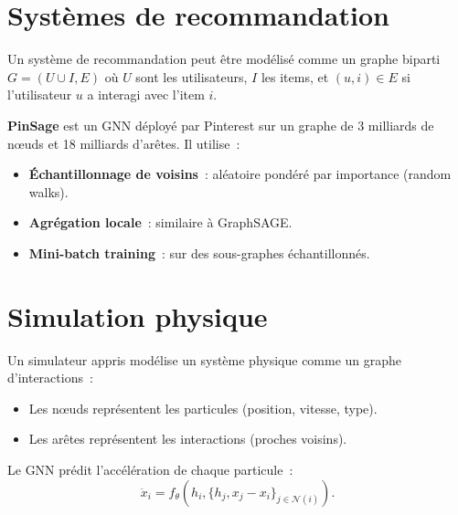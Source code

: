\section{Syst\`emes de recommandation}
\label{sec:recommandation}

\begin{definition}
Un syst\`eme de recommandation peut \^etre mod\'elis\'e comme un
graphe biparti $G = (U \cup I, E)$ o\`u $U$ sont les utilisateurs,
$I$ les items, et $(u, i) \in E$ si l'utilisateur $u$ a interagi
avec l'item $i$.
\end{definition}

\begin{exemple}
\textbf{PinSage} est un GNN d\'eploy\'e par Pinterest sur un graphe
de 3 milliards de n\oe uds et 18 milliards d'ar\^etes. Il utilise~:
\begin{itemize}
  \item \textbf{\'Echantillonnage de voisins}~: al\'eatoire
        pond\'er\'e par importance (random walks).
  \item \textbf{Agr\'egation locale}~: similaire \`a GraphSAGE.
  \item \textbf{Mini-batch training}~: sur des sous-graphes
        \'echantillonn\'es.
\end{itemize}
\end{exemple}

\section{Simulation physique}
\label{sec:physique}

\begin{definition}
Un simulateur appris mod\'elise un syst\`eme physique comme un
graphe d'interactions~:
\begin{itemize}
  \item Les n\oe uds repr\'esentent les particules (position,
        vitesse, type).
  \item Les ar\^etes repr\'esentent les interactions (proches
        voisins).
\end{itemize}
Le GNN pr\'edit l'acc\'el\'eration de chaque particule~:
\[
  \ddot{x}_i = f_\theta\!\left(h_i, \{h_j, x_j - x_i\}_{j \in \mathcal{N}(i)}\right).
\]
\end{definition}

